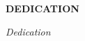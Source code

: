 \newpage
\begin{center}
{\bf DEDICATION}
\end{center}
\vspace{1.5in}
\begin{center}
\textit{Dedication}

\end{center}
